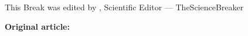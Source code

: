\documentclass[11pt,a4]{article}
\newif\ifimage
\begin{document}
\selectfont

\begin{flushright}\footnotesize {} \end{flushright}\vspace{-2ex}

{\textcolor{SubjectColor}{\large \textbf{}}}




{\small {}}


{\footnotesize {}}
{\footnotesize This Break was edited by \textit{}, Scientific Editor --- TheScienceBreaker}


\vspace{1ex}
\begin{adjustbox}{minipage=0.9\textwidth,center}
\textit{\footnotesize \textcolor{darkgray}{
 }}
\end{adjustbox}

\ifimage
    \begin{figure}[h!]
    \begin{center}
    \texttt{[image: tmp/\\VAR\{fileName]}}
    \vspace{-7pt}
    \caption{\textcolor{darkgray}{\footnotesize 
    \textit{Image credits:} \VAR{imageCredits}
    }}
    \end{center}
    \end{figure}
\fi

\begin{multicols}{2}
\selectfont
{}
\end{multicols}

\textbf{Original article:}\\
{\selectfont
{}}
\end{document}
